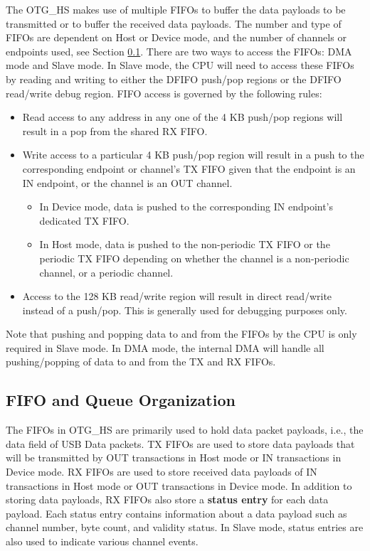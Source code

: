 \documentclass[main\_\_EN.tex]{subfiles}
\begin{document}
The OTG\_HS makes use of multiple FIFOs to buffer the data payloads to be transmitted or to buffer the received data payloads. The number and type of FIFOs are dependent on Host or Device mode, and the number of channels or endpoints used, see Section  \ref{sec:usbotghs-fifo-queue-orga}. There are two ways to access the FIFOs: DMA mode and Slave mode. In Slave mode, the CPU will need to access these FIFOs by reading and writing to either the DFIFO push/pop regions or the DFIFO read/write debug region. FIFO access is governed by the following rules:

\begin{itemize}
\item Read access to any address in any one of the 4 KB push/pop regions will result in a pop from the shared RX FIFO.
\item Write access to a particular 4 KB push/pop region will result in a push to the corresponding endpoint or channel’s TX FIFO given that the endpoint is an IN endpoint, or the channel is an OUT channel.
\begin{itemize}
\item In Device mode, data is pushed to the corresponding IN endpoint’s dedicated TX FIFO.
\item In Host mode, data is pushed to the non-periodic TX FIFO or the periodic TX FIFO depending on whether the channel is a non-periodic channel, or a periodic channel.
\end{itemize}
\item Access to the 128 KB read/write region will result in direct read/write instead of a push/pop. This is generally used for debugging purposes only.
\end{itemize}

Note that pushing and popping data to and from the FIFOs by the CPU is only required in Slave mode. In DMA mode, the internal DMA will handle all pushing/popping of data to and from the TX and RX FIFOs.

\subsection{FIFO and Queue Organization}
\label{sec:usbotghs-fifo-queue-orga}

The FIFOs in OTG\_HS are primarily used to hold data packet payloads, i.e., the data field of USB Data packets. TX FIFOs are used to store data payloads that will be transmitted by OUT transactions in Host mode or IN transactions in Device mode. RX FIFOs are used to store received data payloads of IN transactions in Host mode or OUT transactions in Device mode. In addition to storing data payloads, RX FIFOs also store a \textbf{status entry} for each data payload. Each status entry contains information about a data payload such as channel number, byte count, and validity status. In Slave mode, status entries are also used to indicate various channel events.
\end{document}
